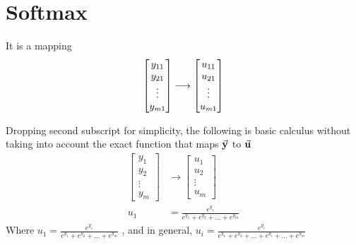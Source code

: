 \section{Softmax} 
It is a  mapping 
\begin{equation}
	\begin{aligned}
		\begin{bmatrix}
			y_{11} \\
			y_{21} \\
			\vdots \\
			y_{m1}  
		\end{bmatrix} & \longrightarrow  
		\begin{bmatrix}
			u_{11} \\
			u_{21} \\
			\vdots \\
			u_{m1}
		\end{bmatrix}   \\	
	\end{aligned} \\
\end{equation}

Dropping second subscript for simplicity, the following is basic calculus without taking into account the 
exact function that maps $\vec{{\bf y}}$ to $\vec{{\bf u}}$
\begin{equation}
	\begin{aligned}
		\begin{bmatrix}
			y_{1} \\
			y_{2} \\
			\vdots \\
			y_{m}  
		\end{bmatrix} & \longrightarrow  
		\begin{bmatrix}
			u_{1} \\
			u_{2} \\
			\vdots \\
			u_{m}
		\end{bmatrix}   \\
		u_{1} & = \frac{e^{y_1}}{e^{y_1} + e^{y_2} + \dots + e^{y_m}}
	\end{aligned}
\end{equation}
Where $u_{1}  = \frac{e^{y_1}}{e^{y_1} + e^{y_2} + \dots + e^{y_m}} $ , and in general, 
$u_{i}  = \frac{e^{y_i}}{e^{y_1} + e^{y_2} + \dots + e^{y_i} + \dots + e^{y_m}} $
